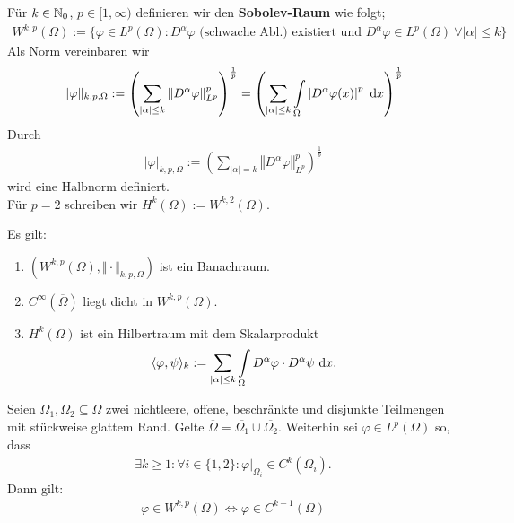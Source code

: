 \begin{definition}
	Für $k\in\mathbb{N}_0$, $p\in[1,\infty)$ definieren wir den \textbf{Sobolev-Raum} wie folgt;
	\begin{align}
		W^{k,p}(\Omega):=\Big\lbrace\varphi\in L^p(\Omega):D^\alpha\varphi\text{ (schwache Abl.) existiert und }D^\alpha\varphi\in L^p(\Omega)~\forall|\alpha|\leq k\Big\rbrace
	\end{align}
	Als Norm vereinbaren wir
	\begin{align*}
		\Vert\varphi\Vert_{k,p,\Omega}:=\left(\sum\limits_{|\alpha|\leq k}\left\Vert D^\alpha\varphi\right\Vert^p_{L^p}\right)^{\frac{1}{p}}
		=\left(\sum\limits_{|\alpha|\leq k}\int\limits_\Omega\left| D^\alpha\varphi(x)\right|^p\text{ d} x\right)^{\frac{1}{p}}
	\end{align*}
	Durch
	\begin{align*}
		|\varphi|_{k,p,\Omega}:=\left(\sum\limits_{|\alpha|= k}\left\Vert D^\alpha\varphi\right\Vert^p_{L^p}\right)^{\frac{1}{p}}
	\end{align*}
	wird eine Halbnorm definiert.\\
	Für $p=2$ schreiben wir $H^k(\Omega):=W^{k,2}(\Omega)$.
\end{definition}

\begin{satz}
	Es gilt:
	\begin{enumerate}
		\item $\left(W^{k,p}(\Omega),\Vert\cdot\Vert_{k,p,\Omega}\right)$ ist ein Banachraum.
		\item $C^\infty(\overline{\Omega})$ liegt dicht in $W^{k,p}(\Omega)$.
		\item $H^k(\Omega)$ ist ein Hilbertraum mit dem Skalarprodukt
		\begin{align*}
			\langle \varphi,\psi\rangle_k:=\sum\limits_{|\alpha|\leq k}\int\limits_\Omega D^\alpha\varphi\cdot D^\alpha\psi\text{ d} x.
		\end{align*}
	\end{enumerate}
\end{satz}

\begin{satz}\label{satz1.4}\enter
	Seien $\Omega_1,\Omega_2\subseteq\Omega$ zwei nichtleere, offene, beschränkte und disjunkte Teilmengen mit stückweise glattem Rand. 
	Gelte
	$\overline{\Omega}=\overline{\Omega_1}\cup\overline{\Omega_2}$.
	Weiterhin sei $\varphi\in L^p(\Omega)$ so, dass 
	\begin{align*}
		\exists k\geq 1:\forall i\in\lbrace1,2\rbrace:\varphi|_{\Omega_i}\in C^k(\overline{\Omega_i}).
	\end{align*}
	Dann gilt:
	\begin{align*}
		\varphi\in W^{k,p}(\Omega)\Longleftrightarrow\varphi\in C^{k-1}(\Omega)
	\end{align*}
\end{satz}

